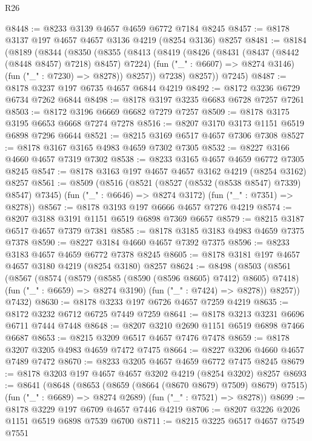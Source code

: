 \begin{lexlean}{R26}
\begin{coremodule}
@8448 := @8233 @3139 @4657 @4659 @6772 @7184 @8245
@8457 := @8178 @3137 @197 @4657 @4657 @3136 @4219 (@8254 @3136) @8257
@8481 := @8184
    (@8189
      (@8344
        (@8350
          (@8355
            (@8413
              (@8419
                (@8426
                  (@8431 (@8437 (@8442 (@8448 @8457) @7218) @8457) @7224)
                  (fun ("_" : @6607) => @8274 @3146)
                  (fun ("_" : @7230) => @8278))
                @8257))
            @7238)
          @8257))
      @7245)
@8487 := @8178 @3237 @197 @6735 @4657 @6844 @4219
@8492 := @8172 @3236 @6729 @6734 @7262 @6844
@8498 := @8178 @3197 @3235 @6683 @6728 @7257 @7261
@8503 := @8172 @3196 @6669 @6682 @7279 @7257
@8509 := @8178 @3175 @3195 @6653 @6668 @7274 @7278
@8516 := @8207 @3170 @3173 @1151 @6519 @6898 @7296 @6644
@8521 := @8215 @3169 @6517 @4657 @7306 @7308
@8527 := @8178 @3167 @3165 @4983 @4659 @7302 @7305
@8532 := @8227 @3166 @4660 @4657 @7319 @7302
@8538 := @8233 @3165 @4657 @4659 @6772 @7305 @8245
@8547 := @8178 @3163 @197 @4657 @4657 @3162 @4219 (@8254 @3162) @8257
@8561 := @8509
    (@8516
      (@8521 (@8527 (@8532 (@8538 @8547) @7339) @8547) @7345)
      (fun ("_" : @6646) => @8274 @3172)
      (fun ("_" : @7351) => @8278))
@8567 := @8178 @3193 @197 @6666 @4657 @7276 @4219
@8574 := @8207 @3188 @3191 @1151 @6519 @6898 @7369 @6657
@8579 := @8215 @3187 @6517 @4657 @7379 @7381
@8585 := @8178 @3185 @3183 @4983 @4659 @7375 @7378
@8590 := @8227 @3184 @4660 @4657 @7392 @7375
@8596 := @8233 @3183 @4657 @4659 @6772 @7378 @8245
@8605 := @8178 @3181 @197 @4657 @4657 @3180 @4219 (@8254 @3180) @8257
@8624 := @8498
    (@8503
      (@8561
        (@8567
          (@8574
            (@8579 (@8585 (@8590 (@8596 @8605) @7412) @8605) @7418)
            (fun ("_" : @6659) => @8274 @3190)
            (fun ("_" : @7424) => @8278))
          @8257))
      @7432)
@8630 := @8178 @3233 @197 @6726 @4657 @7259 @4219
@8635 := @8172 @3232 @6712 @6725 @7449 @7259
@8641 := @8178 @3213 @3231 @6696 @6711 @7444 @7448
@8648 := @8207 @3210 @2690 @1151 @6519 @6898 @7466 @6687
@8653 := @8215 @3209 @6517 @4657 @7476 @7478
@8659 := @8178 @3207 @3205 @4983 @4659 @7472 @7475
@8664 := @8227 @3206 @4660 @4657 @7489 @7472
@8670 := @8233 @3205 @4657 @4659 @6772 @7475 @8245
@8679 := @8178 @3203 @197 @4657 @4657 @3202 @4219 (@8254 @3202) @8257
@8693 := @8641
    (@8648
      (@8653 (@8659 (@8664 (@8670 @8679) @7509) @8679) @7515)
      (fun ("_" : @6689) => @8274 @2689)
      (fun ("_" : @7521) => @8278))
@8699 := @8178 @3229 @197 @6709 @4657 @7446 @4219
@8706 := @8207 @3226 @2026 @1151 @6519 @6898 @7539 @6700
@8711 := @8215 @3225 @6517 @4657 @7549 @7551

\end{coremodule}
\end{lexlean}
